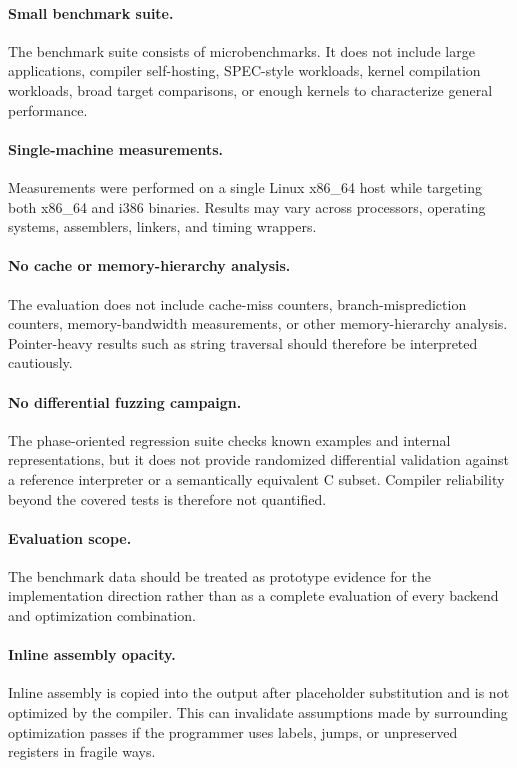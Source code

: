 \documentclass[10pt,twocolumn]{article}
\begin{document}
\paragraph{Small benchmark suite.}
\par The benchmark suite consists of microbenchmarks. It does not include large applications, compiler self-hosting, SPEC-style workloads, kernel compilation workloads, broad target comparisons, or enough kernels to characterize general performance.

\paragraph{Single-machine measurements.}
\par Measurements were performed on a single Linux x86\_64 host while targeting both x86\_64 and i386 binaries. Results may vary across processors, operating systems, assemblers, linkers, and timing wrappers.

\paragraph{No cache or memory-hierarchy analysis.}
\par The evaluation does not include cache-miss counters, branch-misprediction counters, memory-bandwidth measurements, or other memory-hierarchy analysis. Pointer-heavy results such as string traversal should therefore be interpreted cautiously.

\paragraph{No differential fuzzing campaign.}
\par The phase-oriented regression suite checks known examples and internal representations, but it does not provide randomized differential validation against a reference interpreter or a semantically equivalent C subset. Compiler reliability beyond the covered tests is therefore not quantified.

\paragraph{Evaluation scope.}
\par The benchmark data should be treated as prototype evidence for the implementation direction rather than as a complete evaluation of every backend and optimization combination.

\paragraph{Inline assembly opacity.}
\par Inline assembly is copied into the output after placeholder substitution and is not optimized by the compiler. This can invalidate assumptions made by surrounding optimization passes if the programmer uses labels, jumps, or unpreserved registers in fragile ways.
\end{document}
